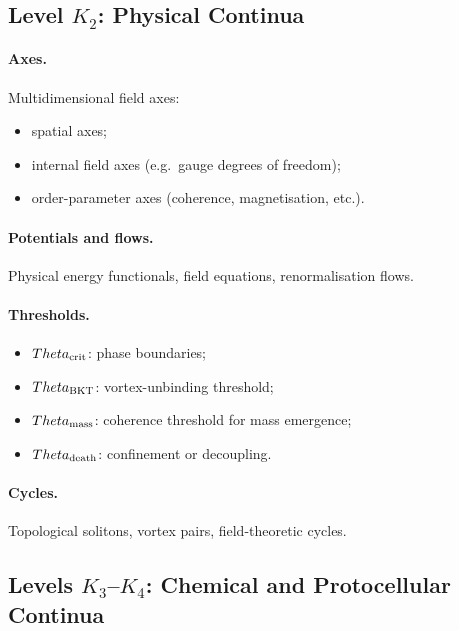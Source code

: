 \subsection{Level \texorpdfstring{\texorpdfstring{$K_2$}{K\_2}}{K2}: Physical Continua}

\paragraph{Axes.}
Multidimensional field axes:
\begin{itemize}
    \item spatial axes;
    \item internal field axes (e.g.\ gauge degrees of freedom);
    \item order-parameter axes (coherence, magnetisation, etc.).
\end{itemize}

\paragraph{Potentials and flows.}
Physical energy functionals, field equations, renormalisation flows.

\paragraph{Thresholds.}
\begin{itemize}
    \item \(\Theta_{\rm crit}\): phase boundaries;
    \item \(\Theta_{\rm BKT}\): vortex-unbinding threshold;
    \item \(\Theta_{\rm mass}\): coherence threshold for mass emergence;
    \item \(\Theta_{\rm death}\): confinement or decoupling.
\end{itemize}

\paragraph{Cycles.}
Topological solitons, vortex pairs, field-theoretic cycles.


\subsection{Levels \texorpdfstring{\texorpdfstring{$K_3$}{K\_3}–\texorpdfstring{$K_4$}{K\_4}}{K3–K4}: Chemical and Protocellular Continua}

